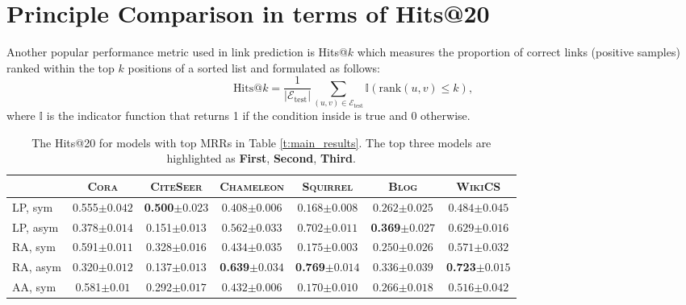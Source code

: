 \documentclass{article}
\newcommand{\firstbest}[1]{\textbf{\textcolor{junscolor1}{#1}}}
\newcommand{\secondbest}[1]{\textbf{\textcolor{junscolor2}{#1}}}
\newcommand{\thirdbest}[1]{\textbf{\textcolor{junscolor3}{#1}}}
\begin{document}
\section{Principle Comparison in terms of Hits@20}\label{app:hits20}
Another popular performance metric used in link prediction is Hits@$k$ which measures the proportion of correct links (positive samples) ranked within the top $k$ positions of a sorted list and formulated as follows:
\begin{equation}\label{eq:hits@k}
    \text{Hits@$k$} = \frac{1}{|\mathcal{E}_{\operatorname{test}}|} \sum_{(u,v) \in \mathcal{E}_{\operatorname{test}}} \mathbb{I}\left(\text{rank}(u,v) \leq k\right), 
\end{equation}
where $\mathbb{I}$ is the indicator function that returns 1 if the condition inside is true and 0 otherwise. 
\begin{table}[htbp]
\caption{The Hits@20 for models with top MRRs in Table \ref{t:main_results}. The top three models are highlighted as \firstbest{First}, \secondbest{Second}, \thirdbest{Third}. \label{t:hr20_results}}
\begin{center}
\begin{tabular}{l c c c c c c}
& \textsc{Cora}  & \textsc{CiteSeer} & \textsc{Chameleon} & \textsc{Squirrel} & \textsc{Blog} & \textsc{WikiCS} \\
\hline
LP, sym	& 0.555${\scriptstyle\pm0.042}$ & \thirdbest{0.500${\scriptstyle\pm0.023}$}
&  $0.408{\scriptstyle\pm0.006}$ &  $0.168{\scriptstyle\pm0.008}$ &  $0.262{\scriptstyle\pm0.025}$ &  $0.484{\scriptstyle\pm0.045}$ \\
LP, asym	& 0.378${\scriptstyle\pm0.014}$ & 0.151${\scriptstyle\pm0.013}$
&  $0.562{\scriptstyle\pm0.033}$ &  $0.702{\scriptstyle\pm0.011}$ &  \thirdbest{0.369${\scriptstyle\pm0.027}$} &  $0.629{\scriptstyle\pm0.016}$ \\
RA, sym	& 0.591${\scriptstyle\pm0.011}$ & 0.328${\scriptstyle\pm0.016}$
&  $0.434{\scriptstyle\pm0.035}$ &  $0.175{\scriptstyle\pm0.003}$ &  $0.250{\scriptstyle\pm0.026}$ &  $0.571{\scriptstyle\pm0.032}$ \\
RA, asym	& 0.320${\scriptstyle\pm0.012}$ & 0.137${\scriptstyle\pm0.013}$
&  \secondbest{0.639${\scriptstyle\pm0.034}$} &  \firstbest{0.769${\scriptstyle\pm0.014}$} &  $0.336{\scriptstyle\pm0.039}$ &  \firstbest{0.723${\scriptstyle\pm0.015}$} \\
AA, sym	& 0.581${\scriptstyle\pm0.01}$ & 0.292${\scriptstyle\pm0.017}$
&  $0.432{\scriptstyle\pm0.006}$ &  $0.170{\scriptstyle\pm0.010}$ &  $0.266{\scriptstyle\pm0.018}$ &  $0.516{\scriptstyle\pm0.042}$ \\

\end{tabular}
\end{center}
\end{table}
\end{document}
